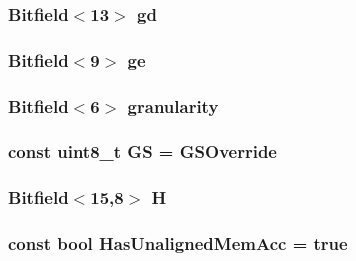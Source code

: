 \hypertarget{namespaceX86ISA_ab7a6c846d5e085a7f875ebc62cfd84a2}{
\subsubsection[{gd}]{\setlength{\rightskip}{0pt plus 5cm}Bitfield$<$13$>$ {\bf gd}}}
\label{namespaceX86ISA_ab7a6c846d5e085a7f875ebc62cfd84a2}
\hypertarget{namespaceX86ISA_ac3dc5bc40d6559d609c4c768bd4be40f}{
\subsubsection[{ge}]{\setlength{\rightskip}{0pt plus 5cm}Bitfield$<$9$>$ {\bf ge}}}
\label{namespaceX86ISA_ac3dc5bc40d6559d609c4c768bd4be40f}
\hypertarget{namespaceX86ISA_ac78b0b5771632d3bcbedc962ab8220a1}{
\subsubsection[{granularity}]{\setlength{\rightskip}{0pt plus 5cm}Bitfield$<$6$>$ {\bf granularity}}}
\label{namespaceX86ISA_ac78b0b5771632d3bcbedc962ab8220a1}
\hypertarget{namespaceX86ISA_a200aa1433f4177e2f2be519cf50eb30c}{
\subsubsection[{GS}]{\setlength{\rightskip}{0pt plus 5cm}const uint8\_\-t {\bf GS} = GSOverride}}
\label{namespaceX86ISA_a200aa1433f4177e2f2be519cf50eb30c}
\hypertarget{namespaceX86ISA_a1cad4492b2894c49eeb063c9a9569580}{
\subsubsection[{H}]{\setlength{\rightskip}{0pt plus 5cm}Bitfield$<$15,8$>$ {\bf H}}}
\label{namespaceX86ISA_a1cad4492b2894c49eeb063c9a9569580}
\hypertarget{namespaceX86ISA_a1c3adbc67ce574fe545e332d3bc677be}{
\subsubsection[{HasUnalignedMemAcc}]{\setlength{\rightskip}{0pt plus 5cm}const bool {\bf HasUnalignedMemAcc} = true}}
